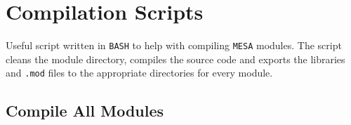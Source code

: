 %
%
%  
%  
%  
%
%  
%
%  

\section{Compilation Scripts}
 \label{sec:compile_scripts}

Useful script written in {\tt BASH} to help with compiling {\tt MESA} 
modules. The script cleans the module directory, compiles the source code and 
exports the libraries and {\tt .mod} files to the appropriate directories 
for every module. 

%  

 \subsection{Compile All Modules}
  

